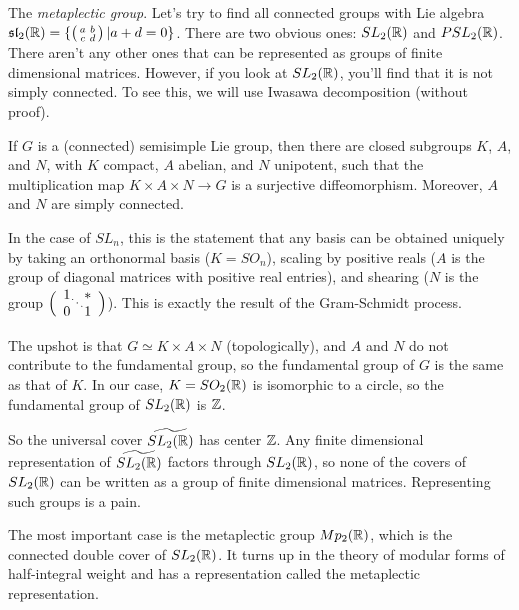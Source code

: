 \begin{enumerate}
 The \emph{metaplectic group}. Let's try to find all
 connected groups with Lie algebra $\mathfrak{sl}_2(\mathbb{R}) = \{\left( \begin{smallmatrix} a & b \\ c & d \end{smallmatrix} \right)| a+d=0\}$.
 There are two obvious ones: $SL_2(\mathbb{R})$ and $PSL_2(\mathbb{R})$. There aren't any other ones
 that can be represented as groups of finite dimensional matrices. However, if you
 look at $SL_2(\mathbb{R})$, you'll find that it is not simply connected. To see this, we
 will use Iwasawa decomposition (without proof).
 \begin{theorem}\label{lec21T:Iwasawa}
   If $G$ is a (connected) semisimple Lie group, then there are closed subgroups $K$,
   $A$, and $N$, with $K$ compact, $A$ abelian, and $N$ unipotent, such that the
   multiplication map $K\times A\times N\to G$ is a surjective diffeomorphism.
   Moreover, $A$ and $N$ are simply connected.
 \end{theorem}
 In the case of $SL_n$, this is the statement that any basis can be obtained uniquely
 by taking an orthonormal basis ($K=SO_n$), scaling by positive reals ($A$ is the
 group of diagonal matrices with positive real entries), and shearing ($N$ is the
 group $\Bigl( \begin{array}{cc}
        1 \smash{\raisebox{-1.5ex}{\rlap{\scriptsize $\ddots$}}}& \ast\\ 0 & 1
        \end{array}\Bigr)$). This is exactly the result of the Gram-Schmidt
 process.

 The upshot is that $G\simeq K\times A \times N$ (topologically), and $A$ and $N$ do
 not contribute to the fundamental group, so the fundamental group of $G$ is the same
 as that of $K$. In our case, $K=SO_2(\mathbb{R})$ is isomorphic to a circle, so the
 fundamental group of $SL_2(\mathbb{R})$ is $\mathbb{Z}$.

 So the universal cover $\widetilde{SL_2(\mathbb{R})}$ has center $\mathbb{Z}$. Any
 finite dimensional representation of $\widetilde{SL_2(\mathbb{R})}$ factors through
 $SL_2(\mathbb{R})$, so none of the covers of $SL_2(\mathbb{R})$ can be written as a group of
 finite dimensional matrices. Representing such groups is a pain.

 The most important case is the metaplectic group $Mp_2(\mathbb{R})$, which is the connected
 double cover of $SL_2(\mathbb{R})$. It turns up in the theory of modular forms of
 half-integral weight and has a representation called the metaplectic representation.
 \end{enumerate}


